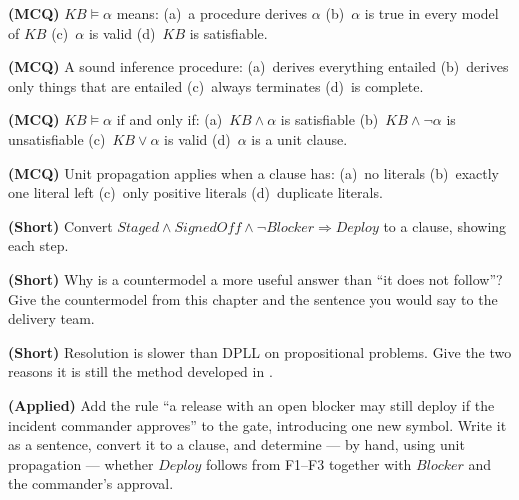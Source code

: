 \begin{reviewq}
  \item \textbf{(MCQ)} $\mathit{KB} \models \alpha$ means: (a)~a procedure derives
        $\alpha$ (b)~$\alpha$ is true in every model of $\mathit{KB}$
        (c)~$\alpha$ is valid (d)~$\mathit{KB}$ is satisfiable.
  \item \textbf{(MCQ)} A sound inference procedure: (a)~derives everything entailed
        (b)~derives only things that are entailed (c)~always terminates
        (d)~is complete.
  \item \textbf{(MCQ)} $\mathit{KB} \models \alpha$ if and only if:
        (a)~$\mathit{KB} \wedge \alpha$ is satisfiable
        (b)~$\mathit{KB} \wedge \neg\alpha$ is unsatisfiable
        (c)~$\mathit{KB} \vee \alpha$ is valid (d)~$\alpha$ is a unit clause.
  \item \textbf{(MCQ)} Unit propagation applies when a clause has:
        (a)~no literals (b)~exactly one literal left (c)~only positive literals
        (d)~duplicate literals.
  \item \textbf{(Short)} Convert
        $\mathit{Staged} \wedge \mathit{SignedOff} \wedge \neg\mathit{Blocker}
        \Rightarrow \mathit{Deploy}$ to a clause, showing each step.
  \item \textbf{(Short)} Why is a countermodel a more useful answer than ``it does
        not follow''? Give the countermodel from this chapter and the sentence you
        would say to the delivery team.
  \item \textbf{(Short)} Resolution is slower than DPLL on propositional problems.
        Give the two reasons it is still the method developed in .
  \item \textbf{(Applied)} Add the rule ``a release with an open blocker may still
        deploy if the incident commander approves'' to the gate, introducing one
        new symbol. Write it as a sentence, convert it to a clause, and determine
        --- by hand, using unit propagation --- whether $\mathit{Deploy}$ follows
        from F1--F3 together with $\mathit{Blocker}$ and the commander's approval.
\end{reviewq}
